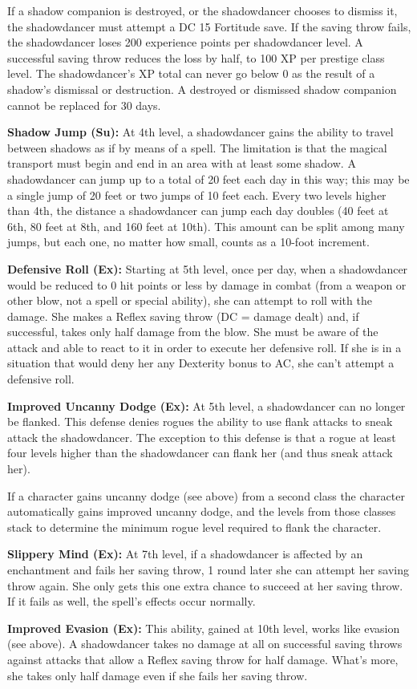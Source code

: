 {If a shadow companion is destroyed, or the shadowdancer chooses to dismiss it, the shadowdancer must attempt a DC 15 Fortitude save. If the saving throw fails, the shadowdancer loses 200 experience points per shadowdancer level. A successful saving throw reduces the loss by half, to 100 XP per prestige class level. The shadowdancer's XP total can never go below 0 as the result of a shadow's dismissal or destruction. A destroyed or dismissed shadow companion cannot be replaced for 30 days.

\textbf{Shadow Jump (Su):} At 4th level, a shadowdancer gains the ability to travel between shadows as if by means of a  spell. The limitation is that the magical transport must begin and end in an area with at least some shadow. A shadowdancer can jump up to a total of 20 feet each day in this way; this may be a single jump of 20 feet or two jumps of 10 feet each. Every two levels higher than 4th, the distance a shadowdancer can jump each day doubles (40 feet at 6th, 80 feet at 8th, and 160 feet at 10th). This amount can be split among many jumps, but each one, no matter how small, counts as a 10-foot increment.

\textbf{Defensive Roll (Ex):} Starting at 5th level, once per day, when a shadowdancer would be reduced to 0 hit points or less by damage in combat (from a weapon or other blow, not a spell or special ability), she can attempt to roll with the damage. She makes a Reflex saving throw (DC = damage dealt) and, if successful, takes only half damage from the blow. She must be aware of the attack and able to react to it in order to execute her defensive roll. If she is in a situation that would deny her any Dexterity bonus to AC, she can't attempt a defensive roll.

\textbf{Improved Uncanny Dodge (Ex):} At 5th level, a shadowdancer can no longer be flanked. This defense denies rogues the ability to use flank attacks to sneak attack the shadowdancer. The exception to this defense is that a rogue at least four levels higher than the shadowdancer can flank her (and thus sneak attack her).

If a character gains uncanny dodge (see above) from a second class the character automatically gains improved uncanny dodge, and the levels from those classes stack to determine the minimum rogue level required to flank the character.

\textbf{Slippery Mind (Ex):} At 7th level, if a shadowdancer is affected by an enchantment and fails her saving throw, 1 round later she can attempt her saving throw again. She only gets this one extra chance to succeed at her saving throw. If it fails as well, the spell's effects occur normally.

\textbf{Improved Evasion (Ex):} This ability, gained at 10th level, works like evasion (see above). A shadowdancer takes no damage at all on successful saving throws against attacks that allow a Reflex saving throw for half damage. What's more, she takes only half damage even if she fails her saving throw.
}
